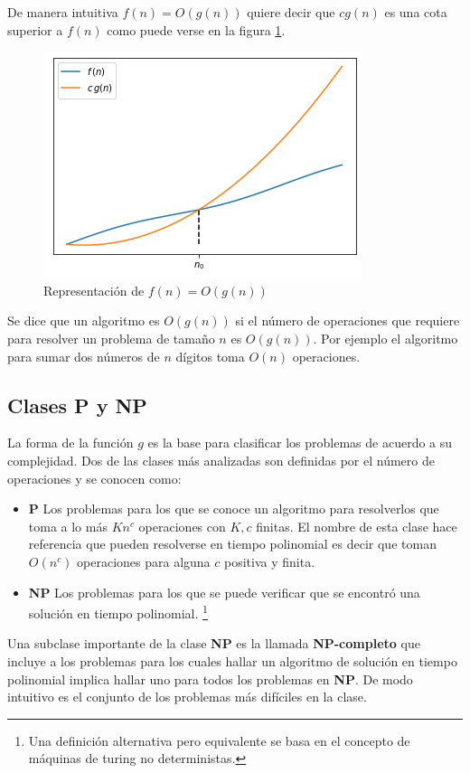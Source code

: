 De manera intuitiva $f(n)=O(g(n))$ quiere decir que $cg(n)$ es una cota superior a $f(n)$ como puede verse en la figura \ref{fig:bigo}.
\begin{figure}[H]
    \centering
    \includegraphics[scale=.8]{Imagenes/bigo.png}
    \caption{Representación de $f(n)= O(g(n))$}
    \label{fig:bigo}
\end{figure}
Se dice que un algoritmo es $O(g(n))$ si el número de operaciones que requiere para resolver un problema de tamaño $n$ es $O(g(n))$. Por ejemplo el algoritmo para sumar dos números de $n$ dígitos toma $O(n)$ operaciones. 

\subsection*{Clases \textbf{P} y \textbf{NP}}
La forma de la función $g$ es la base para clasificar los problemas de acuerdo a su complejidad. Dos de las clases más analizadas son definidas por el número de operaciones y se conocen como:
\begin{itemize} 
    \item \textbf{P}    Los problemas para los que se conoce un algoritmo para resolverlos que toma a lo más $Kn^c$ operaciones con $K,c$ finitas. El nombre de esta clase hace referencia que pueden resolverse en tiempo polinomial es decir que toman $O(n^c)$ operaciones para alguna $c$ positiva y finita. 
    \item \textbf{NP}   Los problemas para los que se puede verificar que se encontró una solución en tiempo polinomial. \footnote{Una definición alternativa pero equivalente se basa en el concepto de máquinas de turing no deterministas.}
\end{itemize}

Una subclase importante de la clase \textbf{NP} es la llamada \textbf{NP-completo} que incluye a los problemas para los cuales hallar un algoritmo de solución en tiempo polinomial implica hallar uno para todos los problemas en \textbf{NP}. De modo intuitivo es el conjunto de los problemas más difíciles en la clase.

